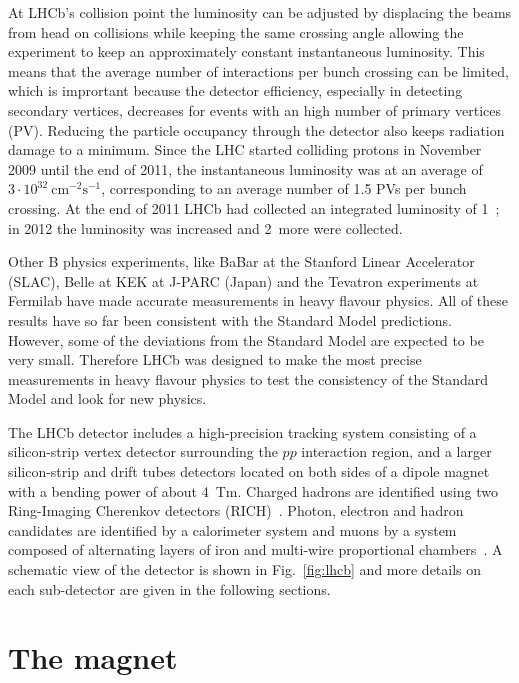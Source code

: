 At LHCb's collision point the luminosity can be adjusted by displacing the beams from head on collisions
while keeping the same crossing angle allowing the experiment to keep an approximately constant instantaneous
luminosity. This means that the average number of interactions per bunch crossing can be limited, which is imprortant
because the detector efficiency, especially in detecting secondary vertices, decreases for events with an high number
of primary vertices (PV). Reducing the particle occupancy through the detector also keeps radiation damage to a minimum. 
Since the LHC started colliding protons in November 2009 until the end of 2011, the instantaneous luminosity was at an 
average of $3 \cdot 10^{32}~\mbox{cm}^{-2}\mbox{s}^{-1}$, corresponding to an average number of 1.5 PVs per bunch crossing.
At the end of 2011 LHCb had collected an integrated luminosity of 1~\invfb; in 2012 the luminosity was increased
and 2~\invfb more were collected.

Other B physics experiments, like BaBar at the Stanford Linear Accelerator (SLAC), Belle at KEK at J-PARC (Japan)
and the Tevatron experiments at Fermilab have made accurate measurements in heavy flavour physics. All of these
results have so far been consistent with the Standard Model predictions. However, some of the deviations from the
Standard Model are expected to be very small. Therefore LHCb was designed to make the most precise measurements
in heavy flavour physics to test the consistency of the Standard Model and look for new physics.

The LHCb detector includes a high-precision tracking system consisting of a silicon-strip
vertex detector surrounding the $pp$ interaction region, and a larger silicon-strip and drift tubes detectors located
on both sides of a dipole magnet with a bending power of about 4~Tm.
Charged hadrons are identified using two
Ring-Imaging Cherenkov detectors (RICH)~\cite{LHCb-DP-2012-003}. Photon, electron and hadron candidates are
identified by a calorimeter system and muons by a system composed of alternating layers of iron
and multi-wire proportional chambers~\cite{LHCb-DP-2012-002}. A schematic view of the detector is shown in Fig.~\ref{fig:lhcb}
and more details on each sub-detector are given in the following sections.

\section{The magnet}

